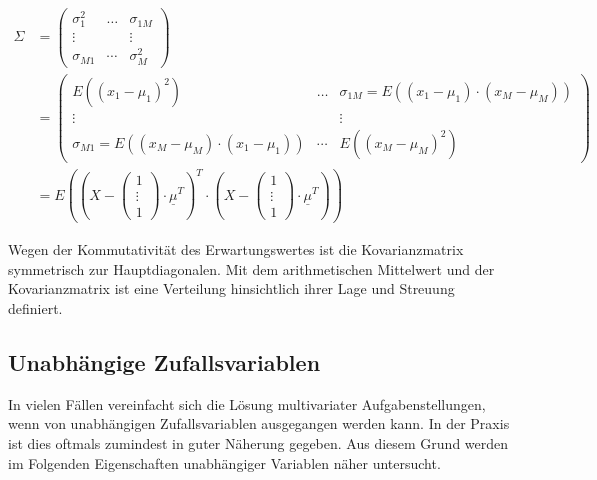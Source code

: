 \begin{equation}\label{eq:eighttwentyeight}
\begin{split}
\Sigma  & = \left(\begin{array}{ccc} {\sigma _{1}^{2} } & {\ldots } & {\sigma _{1M} } \\ {\vdots } & {} & {\vdots } \\ {\sigma _{M1} } & {\cdots } & {\sigma _{M}^{2} } \end{array}\right) \\ 
& = \left(\begin{array}{ccc} {E\left(\left(x_{1} -\mu _{1} \right)^{2} \right)} & {\ldots } & {\sigma _{1M} =E\left(\left(x_{1} -\mu _{1} \right)\cdot \left(x_{M} -\mu _{M} \right)\right)} \\ {\vdots } & {} & {\vdots } \\ {\sigma _{M1} =E\left(\left(x_{M} -\mu _{M} \right)\cdot \left(x_{1} -\mu _{1} \right)\right)} & {\cdots } & {E\left(\left(x_{M} -\mu _{M} \right)^{2} \right)} \end{array}\right) \\ 
& = E\left(\left(X-\left(\begin{array}{c} {1} \\ {\vdots} \\ {1} \end{array}\right)\cdot \underline{\mu }^{T} \right)^{T} \cdot \left(X-\left(\begin{array}{c} {1} \\ {\vdots } \\ {1} \end{array}\right)\cdot \underline{\mu }^{T} \right)\right)
\end{split}
\end{equation}

\noindent Wegen der Kommutativit\"{a}t des Erwartungswertes ist die Kovarianzmatrix symmetrisch zur Hauptdiagonalen. Mit dem arithmetischen Mittelwert und der Kovarianzmatrix ist eine Verteilung hinsichtlich ihrer Lage und Streuung definiert.

\clearpage

\subsection{Unabh\"{a}ngige Zufallsvariablen}

\noindent In vielen F\"{a}llen vereinfacht sich die L\"{o}sung multivariater Aufgabenstellungen, wenn von unabh\"{a}ngigen Zufallsvariablen ausgegangen werden kann. In der Praxis ist dies oftmals zumindest in guter N\"{a}herung gegeben. Aus diesem Grund werden im Folgenden Eigenschaften unabh\"{a}ngiger Variablen n\"{a}her untersucht.

